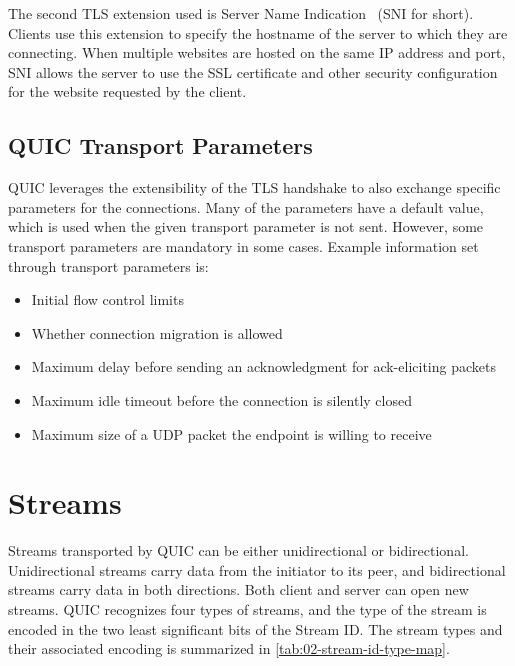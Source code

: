 The second TLS extension used is Server Name Indication~\cite{rfc6066} (SNI for short). Clients use
this extension to specify the hostname of the server to which they are connecting. When multiple
websites are hosted on the same IP address and port, SNI allows the server to use the SSL
certificate and other security configuration for the website requested by the client.

\subsection{QUIC Transport Parameters}

QUIC leverages the extensibility of the TLS handshake to also exchange specific parameters for the
connections. Many of the parameters have a default value, which is used when the given transport
parameter is not sent. However, some transport parameters are mandatory in some cases. Example
information set through transport parameters is:

\begin{itemize}

  \item Initial flow control limits

  \item Whether connection migration is allowed

  \item Maximum delay before sending an acknowledgment for ack-eliciting packets

  \item Maximum idle timeout before the connection is silently closed

  \item Maximum size of a UDP packet the endpoint is willing to receive

\end{itemize}

\section{Streams}

Streams transported by QUIC can be either unidirectional or bidirectional. Unidirectional streams
carry data from the initiator to its peer, and bidirectional streams carry data in both directions.
Both client and server can open new streams. QUIC recognizes four types of streams, and the type of
the stream is encoded in the two least significant bits of the Stream ID. The stream types and their
associated encoding is summarized in \autoref{tab:02-stream-id-type-map}.

